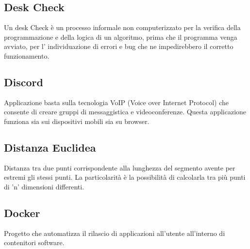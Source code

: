 \subsection*{Desk Check}
Un desk Check è un processo informale non computerizzato per la verifica della programmazione e della logica di un algoritmo, prima che il programma venga avviato, per l' individuazione di errori e bug che ne impedirebbero il corretto funzionamento.

\subsection*{Discord}
Applicazione  basta sulla tecnologia VoIP (Voice over Internet Protocol) che consente di creare gruppi di messaggistica e videoconferenze. Questa applicazione funziona sia sui dispositivi mobili sia su browser.

\subsection*{Distanza Euclidea}
Distanza tra due punti corrispondente alla lunghezza del segmento avente per estremi gli stessi punti. La particolarità è la possibilità di calcolarla tra più punti di 'n' dimensioni differenti.

\subsection*{Docker}
Progetto  che automatizza il rilascio di applicazioni all'utente all'interno di contenitori software.



